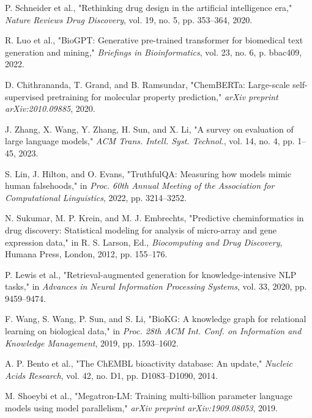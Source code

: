 \documentclass[conference]{IEEEtran}
\begin{document}
\begin{thebibliography}{00}

 P. Schneider et al., "Rethinking drug design in the artificial intelligence era," \emph{Nature Reviews Drug Discovery}, vol. 19, no. 5, pp. 353--364, 2020.

 R. Luo et al., "BioGPT: Generative pre-trained transformer for biomedical text generation and mining," \emph{Briefings in Bioinformatics}, vol. 23, no. 6, p. bbac409, 2022.

 D. Chithrananda, T. Grand, and B. Ramsundar, "ChemBERTa: Large-scale self-supervised pretraining for molecular property prediction," \emph{arXiv preprint arXiv:2010.09885}, 2020.

 J. Zhang, X. Wang, Y. Zhang, H. Sun, and X. Li, "A survey on evaluation of large language models," \emph{ACM Trans. Intell. Syst. Technol.}, vol. 14, no. 4, pp. 1--45, 2023.

 S. Lin, J. Hilton, and O. Evans, "TruthfulQA: Measuring how models mimic human falsehoods," in \emph{Proc. 60th Annual Meeting of the Association for Computational Linguistics}, 2022, pp. 3214--3252.

 N. Sukumar, M. P. Krein, and M. J. Embrechts, "Predictive cheminformatics in drug discovery: Statistical modeling for analysis of micro-array and gene expression data," in R. S. Larson, Ed., \emph{Biocomputing and Drug Discovery}, Humana Press, London, 2012, pp. 155--176.

 P. Lewis et al., "Retrieval-augmented generation for knowledge-intensive NLP tasks," in \emph{Advances in Neural Information Processing Systems}, vol. 33, 2020, pp. 9459--9474.

 F. Wang, S. Wang, P. Sun, and S. Li, "BioKG: A knowledge graph for relational learning on biological data," in \emph{Proc. 28th ACM Int. Conf. on Information and Knowledge Management}, 2019, pp. 1593--1602.

 A. P. Bento et al., "The ChEMBL bioactivity database: An update," \emph{Nucleic Acids Research}, vol. 42, no. D1, pp. D1083--D1090, 2014.

 M. Shoeybi et al., "Megatron-LM: Training multi-billion parameter language models using model parallelism," \emph{arXiv preprint arXiv:1909.08053}, 2019.


\end{thebibliography}
\end{document}

